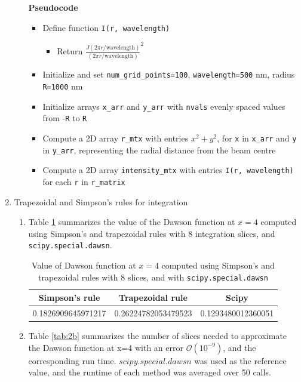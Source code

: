 \documentclass{article}
\newcommand{\code}{\texttt}
\begin{document}
\begin{enumerate}
\begin{enumerate}
    \textbf{Pseudocode}
    \begin{itemize}
        \item Define function \code{I(r, wavelength)}
        \begin{itemize}
            \item Return $\frac{J(2 \pi r /\text{wavelength})}{(2 \pi r /\text{wavelength})}^2$
        \end{itemize}
        \item Initialize and set \code{num\_grid\_points=100}, \code{wavelength=500} nm, radius \code{R=1000} nm
        \item Initialize arrays \code{x\_arr} and \code{y\_arr} with \code{nvals} evenly spaced values from -\code{R} to \code{R}
        \item Compute a 2D array \code{r\_mtx} with entries $x^2+y^2$, for \code{x} in \code{x\_arr} and \code{y} in \code{y\_arr}, representing the radial distance from the beam centre
        \item Compute a 2D array \code{intensity\_mtx} with entries \code{I(r, wavelength)} for each \code{r} in \code{r\_matrix}
    \end{itemize}

    \end{enumerate}

\item Trapezoidal and Simpson’s rules for integration
\begin{enumerate}
    \item Table \ref{tab:2a} summarizes the value of the Dawson function at $x=4$ computed using Simpson's and trapezoidal rules with 8 integration slices, and \code{scipy.special.dawsn}.

    \begin{table}[H]
    \centering
    \begin{tabular}{c|c|c}
        Simpson's rule & Trapezoidal rule & Scipy \\\hline 
        0.1826909645971217 & 0.26224782053479523 & 0.1293480012360051
    \end{tabular}
    \captionsetup{width=0.65\textwidth}
    \caption{Value of Dawson function at $x=4$ computed using Simpson's and trapezoidal rules with 8 slices, and with \code{scipy.special.dawsn}}
    \label{tab:2a}
    \end{table}

    \item Table \ref{tab:2b} summarizes the number of slices needed to approximate the Dawson function at x=4 with an error $\mathcal{O}(10^{-9})$, and the corresponding run time. $scipy.special.dawsn$ was used as the reference value, and the runtime of each method was averaged over 50 calls. 
    

\end{enumerate}
\end{enumerate}
\end{document}

